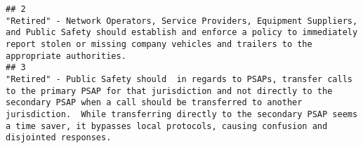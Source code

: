 \documentclass[
]{article}
\begin{document}
\begin{verbatim}
## 2                                                                                                                                                                                                                                                                                                                                                                                                                                                                                                                                                                                                                                                                                                                                                                                                                                                                                                                                                                                                                                                                                                                                                                                                                                    "Retired" - Network Operators, Service Providers, Equipment Suppliers, and Public Safety should establish and enforce a policy to immediately report stolen or missing company vehicles and trailers to the appropriate authorities.
## 3                                                                                                                                                                                                                                                                                                                                                                                                                                                                                                                                                                                                                                                                                                                                                                                                                                                                                                                                                                                                                                                                                                       "Retired" - Public Safety should  in regards to PSAPs, transfer calls to the primary PSAP for that jurisdiction and not directly to the secondary PSAP when a call should be transferred to another jurisdiction.  While transferring directly to the secondary PSAP seems a time saver, it bypasses local protocols, causing confusion and disjointed responses.

\end{verbatim}
\end{document}
